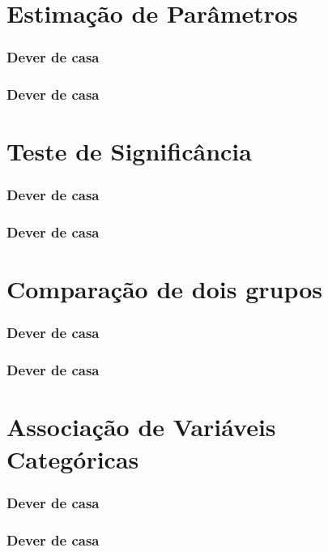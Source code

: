 \documentclass[graphics,14pt]{beamer}
\begin{document}
\section[Estimação de Parâmetros]{Estimação de Parâmetros}
\begin{frame}[t,fragile=singleslide]
\frametitle{Dever de casa}
\end{frame}

\begin{frame}[t,fragile=singleslide]
\frametitle{Dever de casa}
\end{frame}
\section[Teste de Significância]{Teste de Significância}
\begin{frame}[t,fragile=singleslide]
\frametitle{Dever de casa}
\end{frame}

\begin{frame}[t,fragile=singleslide]
\frametitle{Dever de casa}
\end{frame}
\section{Comparação de dois grupos}
\begin{frame}[t,fragile=singleslide]
\frametitle{Dever de casa}
\end{frame}

\begin{frame}[t,fragile=singleslide]
\frametitle{Dever de casa}
\end{frame}
\section{Associação de Variáveis Categóricas}
\begin{frame}[t,fragile=singleslide]
\frametitle{Dever de casa}
\end{frame}
\begin{frame}[t,fragile=singleslide]
\frametitle{Dever de casa}
\end{frame}
\end{document}
